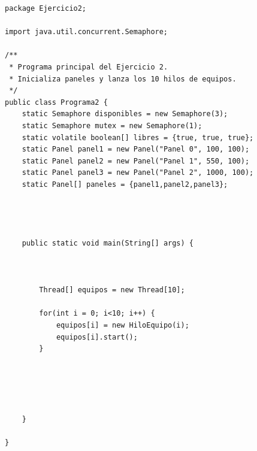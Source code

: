 \documentclass[12pt,a4paper]{article}
\begin{document}
\begin{lstlisting}[caption={Programa2.java}]
package Ejercicio2;

import java.util.concurrent.Semaphore;

/**
 * Programa principal del Ejercicio 2.
 * Inicializa paneles y lanza los 10 hilos de equipos.
 */
public class Programa2 {
	static Semaphore disponibles = new Semaphore(3);
	static Semaphore mutex = new Semaphore(1);
	static volatile boolean[] libres = {true, true, true};
	static Panel panel1 = new Panel("Panel 0", 100, 100);
	static Panel panel2 = new Panel("Panel 1", 550, 100);
	static Panel panel3 = new Panel("Panel 2", 1000, 100);
	static Panel[] paneles = {panel1,panel2,panel3};




	public static void main(String[] args) {

		
		
		Thread[] equipos = new Thread[10];
		
		for(int i = 0; i<10; i++) {
			equipos[i] = new HiloEquipo(i);
			equipos[i].start();
		}
		
		
		
		
		
	}

}

\end{lstlisting}
\end{document}
